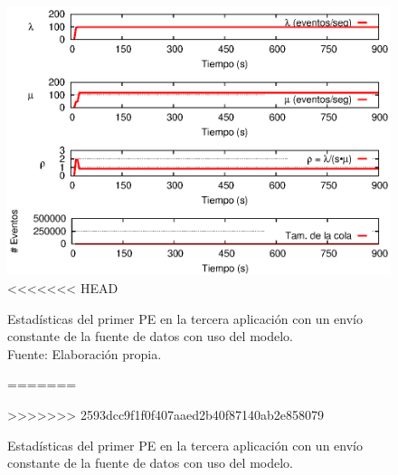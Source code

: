 \begin{figure}[!htp]
    \centering
    \captionsetup{justification=centering}
    \includegraphics[scale=1]{images/exp/app3/cm/logical/statusOnePE.eps}
<<<<<<< HEAD
    \caption[Estadísticas del primer PE en la tercera aplicación con un envío constante de la fuente de datos con uso del modelo.]{Estadísticas del primer PE en la tercera aplicación con un envío constante de la fuente de datos con uso del modelo.\\Fuente: Elaboración propia.}
=======
    \caption{Estad\'isticas del primer PE en la tercera aplicaci\'on con un env\'io constante de la fuente de datos con uso del modelo.}
>>>>>>> 2593dcc9f1f0f407aaed2b40f87140ab2e858079
    \label{fig:app3-statusOnePE-cm}
\end{figure}


